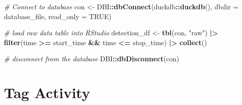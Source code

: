 \documentclass[
]{book}
\newenvironment{Shaded}{\begin{snugshade}}{\end{snugshade}}
\newcommand{\AttributeTok}[1]{\textcolor[rgb]{0.13,0.29,0.53}{#1}}
\newcommand{\CommentTok}[1]{\textcolor[rgb]{0.56,0.35,0.01}{\textit{#1}}}
\newcommand{\ConstantTok}[1]{\textcolor[rgb]{0.56,0.35,0.01}{#1}}
\newcommand{\FunctionTok}[1]{\textcolor[rgb]{0.13,0.29,0.53}{\textbf{#1}}}
\newcommand{\NormalTok}[1]{#1}
\newcommand{\OtherTok}[1]{\textcolor[rgb]{0.56,0.35,0.01}{#1}}
\newcommand{\SpecialCharTok}[1]{\textcolor[rgb]{0.81,0.36,0.00}{\textbf{#1}}}
\newcommand{\StringTok}[1]{\textcolor[rgb]{0.31,0.60,0.02}{#1}}
\begin{document}
\begin{Shaded}
\begin{Highlighting}[]
\CommentTok{\# Connect to database}
\NormalTok{con }\OtherTok{\textless{}{-}}\NormalTok{ DBI}\SpecialCharTok{::}\FunctionTok{dbConnect}\NormalTok{(duckdb}\SpecialCharTok{::}\FunctionTok{duckdb}\NormalTok{(), }
                      \AttributeTok{dbdir =}\NormalTok{ database\_file, }
                      \AttributeTok{read\_only =} \ConstantTok{TRUE}\NormalTok{)}

\CommentTok{\# load raw data table into RStudio}
\NormalTok{detection\_df }\OtherTok{\textless{}{-}} \FunctionTok{tbl}\NormalTok{(con, }\StringTok{"raw"}\NormalTok{) }\SpecialCharTok{|\textgreater{}} 
  \FunctionTok{filter}\NormalTok{(time }\SpecialCharTok{\textgreater{}=}\NormalTok{ start\_time }\SpecialCharTok{\&\&}\NormalTok{ time }\SpecialCharTok{\textless{}=}\NormalTok{ stop\_time) }\SpecialCharTok{|\textgreater{}}
  \FunctionTok{collect}\NormalTok{()}

\CommentTok{\# disconnect from the database}
\NormalTok{DBI}\SpecialCharTok{::}\FunctionTok{dbDisconnect}\NormalTok{(con)}
\end{Highlighting}
\end{Shaded}

\section{Tag Activity}\label{tag-activity}
\end{document}
